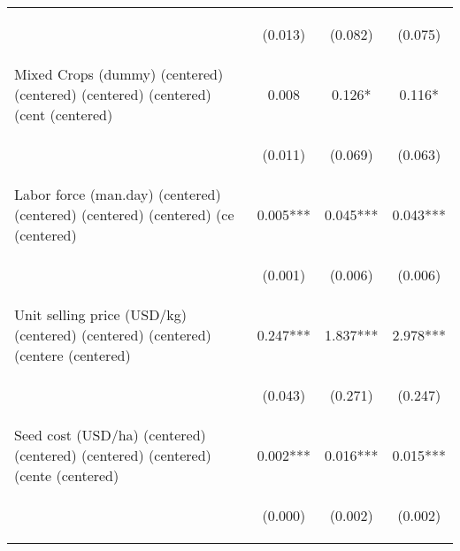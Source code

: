 \begin{center}
\begin{tabular}{lccc}
\vspace{4pt} & \begin{footnotesize}(0.013)\end{footnotesize} & \begin{footnotesize}(0.082)\end{footnotesize} & \begin{footnotesize}(0.075)\end{footnotesize} \\
Mixed Crops (dummy) (centered) (centered) (centered) (centered) (cent (centered) & 0.008 & 0.126* & 0.116* \\
\vspace{4pt} & \begin{footnotesize}(0.011)\end{footnotesize} & \begin{footnotesize}(0.069)\end{footnotesize} & \begin{footnotesize}(0.063)\end{footnotesize} \\
Labor force (man.day) (centered) (centered) (centered) (centered) (ce (centered) & 0.005*** & 0.045*** & 0.043*** \\
\vspace{4pt} & \begin{footnotesize}(0.001)\end{footnotesize} & \begin{footnotesize}(0.006)\end{footnotesize} & \begin{footnotesize}(0.006)\end{footnotesize} \\
Unit selling price (USD/kg) (centered) (centered) (centered) (centere (centered) & 0.247*** & 1.837*** & 2.978*** \\
\vspace{4pt} & \begin{footnotesize}(0.043)\end{footnotesize} & \begin{footnotesize}(0.271)\end{footnotesize} & \begin{footnotesize}(0.247)\end{footnotesize} \\
Seed cost (USD/ha) (centered) (centered) (centered) (centered) (cente (centered) & 0.002*** & 0.016*** & 0.015*** \\
\vspace{4pt} & \begin{footnotesize}(0.000)\end{footnotesize} & \begin{footnotesize}(0.002)\end{footnotesize} & \begin{footnotesize}(0.002)\end{footnotesize} \\

\end{tabular}
\end{center}
